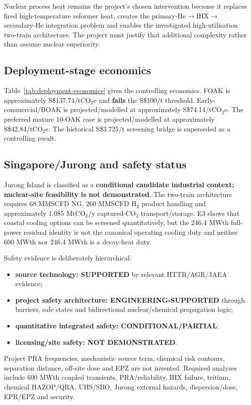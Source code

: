 Nuclear process heat remains the project's chosen intervention because it replaces fired high-temperature reformer heat, creates the primary-He$\rightarrow$IHX$\rightarrow$secondary-He integration problem and enables the investigated high-utilisation two-train architecture. The project must justify that additional complexity rather than assume nuclear superiority.

\subsection{Deployment-stage economics}
Table~\ref{tab:deployment-economics} gives the controlling economics. FOAK is approximately S\$137.74/tCO$_2$e and \textbf{fails} the S\$100/t threshold. Early-commercial/BOAK is projected/modelled at approximately S\$74.14/tCO$_2$e. The preferred mature 10-OAK case is projected/modelled at approximately S\$42.84/tCO$_2$e. The historical S\$3.725/t screening bridge is superseded as a controlling result.

\subsection{Singapore/Jurong and safety status}
Jurong Island is classified as a \textbf{conditional candidate industrial context; nuclear-site feasibility is not demonstrated}. The two-train architecture requires 68 MMSCFD NG, 260 MMSCFD H$_2$ product handling and approximately 1.085 MtCO$_2$/y captured-CO$_2$ transport/storage. E3 shows that coastal cooling options can be screened quantitatively, but the 246.4 MWth full-power residual identity is not the canonical operating cooling duty and neither 600 MWth nor 246.4 MWth is a decay-heat duty.

Safety evidence is deliberately hierarchical:
\begin{itemize}
\item \textbf{source technology: SUPPORTED} by relevant HTTR/AGR/JAEA evidence;
\item \textbf{project safety architecture: ENGINEERING-SUPPORTED} through barriers, safe states and bidirectional nuclear/chemical propagation logic;
\item \textbf{quantitative integrated safety: CONDITIONAL/PARTIAL};
\item \textbf{licensing/site safety: NOT DEMONSTRATED}.
\end{itemize}
Project PRA frequencies, mechanistic source term, chemical risk contours, separation distance, off-site dose and EPZ are not invented. Required analyses include 600 MWth coupled transients, PRA/reliability, IHX failure, tritium, chemical HAZOP/QRA, UHS/SBO, Jurong external hazards, dispersion/dose, EPR/EPZ and security.

